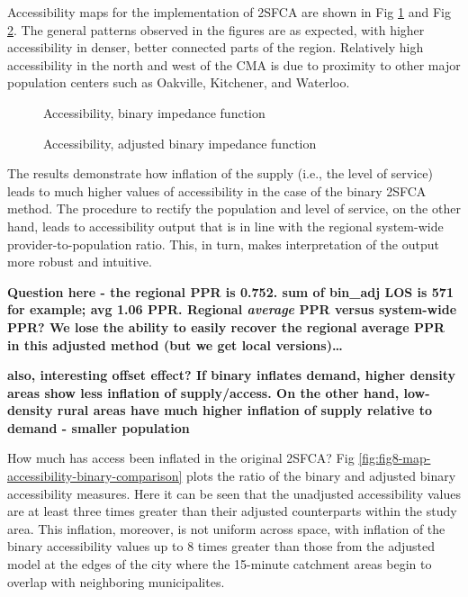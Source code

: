 \documentclass[10pt,letterpaper]{article}
\begin{document}
Accessibility maps for the implementation of 2SFCA are shown in Fig
\ref{fig:fig7-map-accessibility-binary} and Fig
\ref{fig:fig8-map-accessibility-binary-adjusted}. The general patterns
observed in the figures are as expected, with higher accessibility in
denser, better connected parts of the region. Relatively high
accessibility in the north and west of the CMA is due to proximity to
other major population centers such as Oakville, Kitchener, and
Waterloo.

\begin{figure}[htbp]
\centering
\caption{\label{fig:fig7-map-accessibility-binary}Accessibility, binary
impedance function}
\end{figure}

\begin{figure}[htbp]
\centering
\caption{\label{fig:fig8-map-accessibility-binary-adjusted}Accessibility,
adjusted binary impedance function}
\end{figure}

The results demonstrate how inflation of the supply (i.e., the level of
service) leads to much higher values of accessibility in the case of the
binary 2SFCA method. The procedure to rectify the population and level
of service, on the other hand, leads to accessibility output that is in
line with the regional system-wide provider-to-population ratio. This,
in turn, makes interpretation of the output more robust and intuitive.

\textbf{Question here - the regional PPR is 0.752. sum of bin\_adj LOS
is 571 for example; avg 1.06 PPR. Regional \emph{average} PPR versus
system-wide PPR? We lose the ability to easily recover the regional
average PPR in this adjusted method (but we get local versions)\ldots{}
}

\textbf{also, interesting offset effect? If binary inflates demand,
higher density areas show less inflation of supply/access. On the other
hand, low-density rural areas have much higher inflation of supply
relative to demand - smaller population}

How much has access been inflated in the original 2SFCA? Fig
\ref{fig:fig8-map-accessibility-binary-comparison} plots the ratio of
the binary and adjusted binary accessibility measures. Here it can be
seen that the unadjusted accessibility values are at least three times
greater than their adjusted counterparts within the study area. This
inflation, moreover, is not uniform across space, with inflation of the
binary accessibility values up to 8 times greater than those from the
adjusted model at the edges of the city where the 15-minute catchment
areas begin to overlap with neighboring municipalites.
\end{document}
